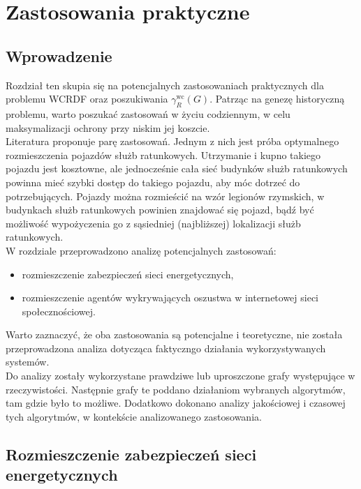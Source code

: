 \chapter{Zastosowania praktyczne}

\section{Wprowadzenie}

Rozdział ten skupia się na potencjalnych zastosowaniach praktycznych dla problemu WCRDF oraz poszukiwania $\gamma^{\text{wc}}_R(G)$. Patrząc na genezę historyczną problemu, warto poszukać zastosowań w życiu codziennym, w celu maksymalizacji ochrony przy niskim jej koszcie\cite{theoryWCRDF}.\\
Literatura proponuje parę zastosowań. Jednym z nich jest próba optymalnego rozmieszczenia pojazdów służb ratunkowych. Utrzymanie i kupno takiego pojazdu jest kosztowne, ale jednocześnie cała sieć budynków służb ratunkowych powinna mieć szybki dostęp do takiego pojazdu, aby móc dotrzeć do potrzebujących. Pojazdy można rozmieścić na wzór legionów rzymskich, w budynkach służb ratunkowych powinien znajdować się pojazd, bądź być możliwość wypożyczenia go z sąsiedniej (najbliższej) lokalizacji służb ratunkowych\cite{improvedILP}.\\
W rozdziale przeprowadzono analizę potencjalnych zastosowań:
\begin{itemize}
    \item rozmieszczenie zabezpieczeń sieci energetycznych,
    \item rozmieszczenie agentów wykrywających oszustwa w internetowej sieci
    społecznościowej.
\end{itemize}
Warto zaznaczyć, że oba zastosowania są potencjalne i teoretyczne, nie została przeprowadzona analiza dotycząca faktyczngo działania wykorzystywanych systemów.\\
Do analizy zostały wykorzystane prawdziwe lub uproszczone grafy występujące w rzeczywistości. Następnie grafy te poddano działaniom wybranych algorytmów, tam gdzie było to możliwe. Dodatkowo dokonano analizy jakościowej i czasowej tych algorytmów, w kontekście analizowanego zastosowania.

\section{Rozmieszczenie zabezpieczeń sieci energetycznych}

